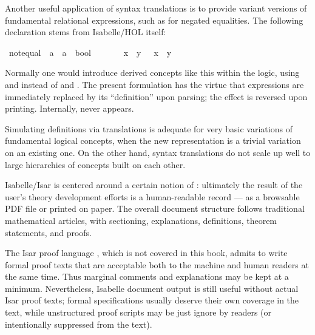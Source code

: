 \begin{isabellebody}
\begin{isamarkuptext}
  \medskip Another useful application of syntax translations is to
  provide variant versions of fundamental relational expressions, such
  as \isa{{\isasymnoteq}} for negated equalities.  The following declaration
  stems from Isabelle/HOL itself:%
\end{isamarkuptext}%
\isamarkuptrue%
\ {\isachardoublequote}{\isacharunderscore}not{\isacharunderscore}equal{\isachardoublequote}\ {\isacharcolon}{\isacharcolon}\ {\isachardoublequote}{\isacharprime}a\ {\isasymRightarrow}\ {\isacharprime}a\ {\isasymRightarrow}\ bool{\isachardoublequote}\ \ \ \ {\isacharparenleft}\ {\isachardoublequote}{\isasymnoteq}{\isasymignore}{\isachardoublequote}\ {}{}{\isacharparenright}\isanewline
\isamarkupfalse%
\ {\isachardoublequote}x\ {\isasymnoteq}{\isasymignore}\ y{\isachardoublequote}\ {\isasymrightleftharpoons}\ {\isachardoublequote}{\isasymnot}\ {\isacharparenleft}x\ {\isacharequal}\ y{\isacharparenright}{\isachardoublequote}\isamarkupfalse%
%
\begin{isamarkuptext}%
\noindent Normally one would introduce derived concepts like this
  within the logic, using  and 
  instead of  and .  The
  present formulation has the virtue that expressions are immediately
  replaced by its ``definition'' upon parsing; the effect is reversed
  upon printing.  Internally, \isa{{\isasymnoteq}} never appears.

  Simulating definitions via translations is adequate for very basic
  variations of fundamental logical concepts, when the new
  representation is a trivial variation on an existing one.  On the
  other hand, syntax translations do not scale up well to large
  hierarchies of concepts built on each other.%
\end{isamarkuptext}%
\isamarkuptrue%
%
\isamarkuptrue%
%
\begin{isamarkuptext}%
Isabelle/Isar is centered around a certain notion of : ultimately the result of the
  user's theory development efforts is a human-readable record --- as
  a browsable PDF file or printed on paper.  The overall document
  structure follows traditional mathematical articles, with
  sectioning, explanations, definitions, theorem statements, and
  proofs.

  The Isar proof language \cite{Wenzel-PhD}, which is not covered in
  this book, admits to write formal proof texts that are acceptable
  both to the machine and human readers at the same time.  Thus
  marginal comments and explanations may be kept at a minimum.
  Nevertheless, Isabelle document output is still useful without
  actual Isar proof texts; formal specifications usually deserve their
  own coverage in the text, while unstructured proof scripts may be
  just ignore by readers (or intentionally suppressed from the text).


\end{isamarkuptext}
\end{isabellebody}
